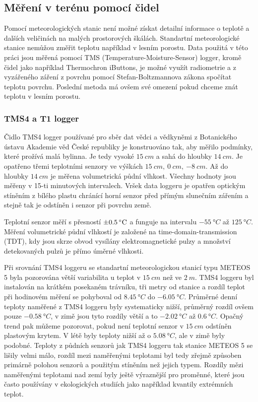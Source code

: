 \subsection{Měření v terénu pomocí čidel}
Pomocí meteorologických stanic není možné získat detailní informace o teplotě a dalších veličinách na malých prostorových škálách. Standartní meteorologické stanice nemůžou změřit teplotu například v lesním porostu. Data použitá v této práci jsou měřená pomocí TMS (Temperature-Moisture-Sensor) logger, kromě čidel jako například Thermochron iButtons, je možné využít radiometrie a z vyzářeného záření z povrchu pomocí Stefan-Boltzmannova zákona spočítat teplotu povrchu. Poslední metoda má ovšem své omezení pokud chceme znát teplotu v lesním porostu. 

\subsubsection{TMS4 a T1 logger} \label{chap:loggers}
Čidlo TMS4 logger používané pro sběr dat vědci a vědkyněmi z Botanického ústavu Akademie věd České republiky je konstruováno tak, aby měřilo podmínky, které prožívá malá bylinna. Je tedy vysoké $\SI{15}{cm}$ a sahá do hloubky $\SI{14}{cm}$. Je opatřeno třemi teplotními senzory ve výškách $\SI{15}{cm},\ \SI{0}{cm},\ \SI{-8}{cm}$. Až do hloubky $\SI{14}{cm}$ je měřena volumetrická půdní vlhkost. Všechny hodnoty jsou měřeny v 15-ti minutových intervalech. Vršek data loggeru je opatřen optickým stíněním z bílého plastu chránící horní senzor před přímým slunečním zářením a stejně tak je odstíněn i senzor při povrchu země. 

Teplotní senzor měří s přesností $\SI{\pm 0.5}{\degree C}$ a funguje na intervalu $\SI{-55}{\degree C}$ až $\SI{125}{\degree C}$. Měření volumetrické půdní vlhkostí je založené na time-domain-transmission (TDT), kdy jsou skrze obvod vysílány elektromagnetické pulzy a množství detekovaných pulzů je přímo úměrné vlhkosti. 

Při srovnání TMS4 loggeru se standartní meteorologickou stanicí typu METEOS 5 byla pozorována větší variabilita u teplot v $\SI{15}{cm}$ než ve $\SI{2}{m}$. TMS4 loggeru byl instalován na krátkém posekaném trávníku, tři metry od stanice a rozdíl teplot při hodinovém měření se pohyboval od $\SI{+8.45}{\degree C}$ do $\SI{-6.05}{\degree C}$. Průměrné denní teploty naměřené z TMS4 loggeru byly systematicky nižší, průměrný rozdíl ovšem pouze $\SI{-0.58}{\degree C}$, v zimě jsou tyto rozdíly větší a to $\SI{-2.02}{\degree C}$ až $\SI{0.6}{\degree C}$. Opačný trend pak můžeme pozorovat, pokud není teplotní senzor v $\SI{15}{cm}$ odstíněn plastovým krytem. V létě byly teploty nižší až o $\SI{5.08}{\degree C}$, ale v zimě byly podobné. Teploty z půdních senzorů jak TMS4 loggeru tak stanice METEOS 5 se lišily velmi málo, rozdíl mezi naměřenými teplotami byl tedy zřejmě způsoben primárně polohou senzorů a použitým stíněním než jejich typem. Rozdíly mězi naměřenými teplotami nad zemí byly ještě výraznější pro proměnné, které jsou často používány v ekologických studiích jako například kvantily extrémních teplot\cite{WildJan2019Caer}. 

